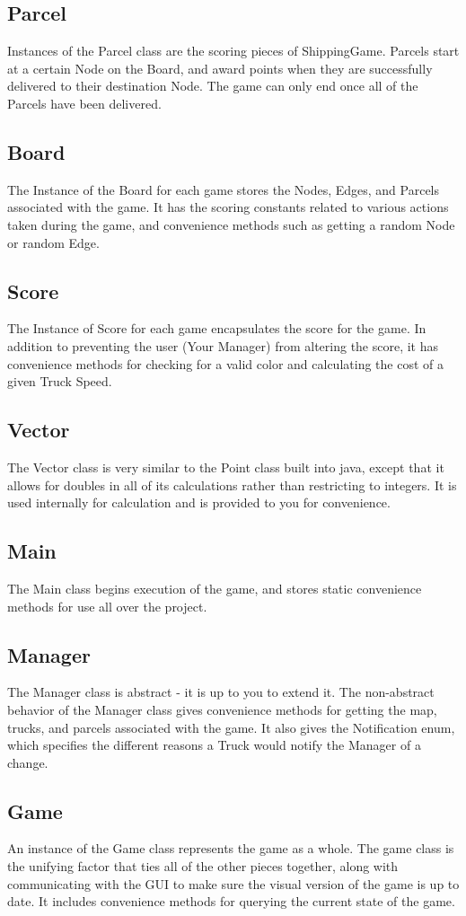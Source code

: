 \documentclass[11pt]{article}
\begin{document}
\subsection{Parcel}
Instances of the Parcel class are the scoring pieces of ShippingGame. Parcels start at a certain Node on the Board, and award points when they are successfully delivered to their destination Node. The game can only end once all of the Parcels have been delivered.
\subsection{Board}
The Instance of the Board for each game stores the Nodes, Edges, and Parcels associated with the game. It has the scoring constants related to various actions taken during the game, and convenience methods such as getting a random Node or random Edge.
\subsection{Score}
The Instance of Score for each game encapsulates the score for the game. In addition to preventing the user (Your Manager) from altering the score, it has convenience methods for checking for a valid color and calculating the cost of a given Truck Speed.
\subsection{Vector}
The Vector class is very similar to the Point class built into java, except that it allows for doubles in all of its calculations rather than restricting to integers. It is used internally for calculation and is provided to you for convenience.
\subsection{Main}
The Main class begins execution of the game, and stores static convenience methods for use all over the project.
\subsection{Manager}
The Manager class is abstract - it is up to you to extend it. The non-abstract behavior of the Manager class gives convenience methods for getting the map, trucks, and parcels associated with the game. It also gives the Notification enum, which specifies the different reasons a Truck would notify the Manager of a change.
\subsection{Game}
An instance of the Game class represents the game as a whole. The game class is the unifying factor that ties all of the other pieces together, along with communicating with the GUI to make sure the visual version of the game is up to date. It includes convenience methods for querying the current state of the game.
\end{document}
